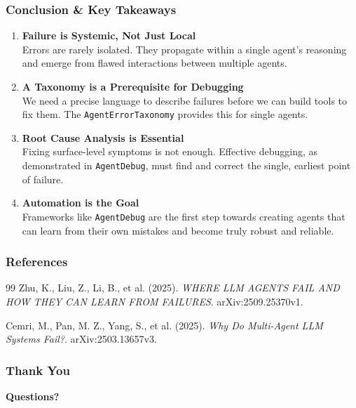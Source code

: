 \documentclass[10pt]{beamer}
\begin{document}
\begin{frame}
  \frametitle{Conclusion \& Key Takeaways}
  
  \begin{enumerate}
    \item \textbf{Failure is Systemic, Not Just Local} \\ Errors are rarely isolated. They propagate within a single agent's reasoning and emerge from flawed interactions between multiple agents.
    \vfill
    \item \textbf{A Taxonomy is a Prerequisite for Debugging} \\ We need a precise language to describe failures before we can build tools to fix them. The \texttt{AgentErrorTaxonomy} provides this for single agents.
    \vfill
    \item \textbf{Root Cause Analysis is Essential} \\ Fixing surface-level symptoms is not enough. Effective debugging, as demonstrated in \texttt{AgentDebug}, must find and correct the single, earliest point of failure.
    \vfill
    \item \textbf{Automation is the Goal} \\ Frameworks like \texttt{AgentDebug} are the first step towards creating agents that can learn from their own mistakes and become truly robust and reliable.
  \end{enumerate}
\end{frame}

\begin{frame}[allowframebreaks]
  \frametitle{References}
  \begin{thebibliography}{99}
    Zhu, K., Liu, Z., Li, B., et al. (2025).
    \newblock \textit{WHERE LLM AGENTS FAIL AND HOW THEY CAN LEARN FROM FAILURES}.
    \newblock arXiv:2509.25370v1.
    
    Cemri, M., Pan, M. Z., Yang, S., et al. (2025).
    \newblock \textit{Why Do Multi-Agent LLM Systems Fail?}.
    \newblock arXiv:2503.13657v3.
    
  \end{thebibliography}
\end{frame}

\begin{frame}
  \frametitle{Thank You}
  \begin{center}
    \huge \textbf{Questions?}
  \end{center}
\end{frame}
\end{document}
